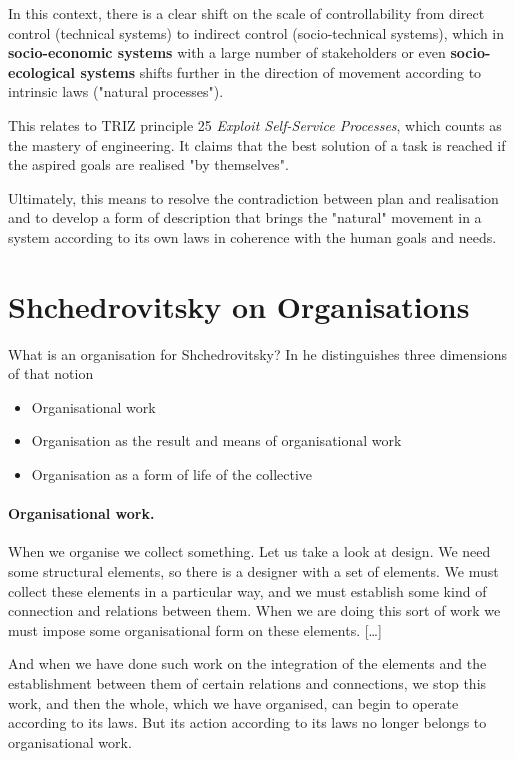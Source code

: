 \documentclass[11pt,a4paper]{article}
\begin{document}
In this context, there is a clear shift on the scale of controllability from
direct control (technical systems) to indirect control (socio-technical
systems), which in \textbf{socio-economic systems} with a large number of
stakeholders or even \textbf{socio-ecological systems} shifts further in the
direction of movement according to intrinsic laws ("natural processes").

This relates to TRIZ principle 25 \emph{Exploit Self-Service Processes}, which
counts as the mastery of engineering.  It claims that the best solution of a
task is reached if the aspired goals are realised "by themselves".

Ultimately, this means to resolve the contradiction between plan and
realisation and to develop a form of description that brings the "natural"
movement in a system according to its own laws in coherence with the human
goals and needs.

\section{Shchedrovitsky on Organisations}

What is an organisation for Shchedrovitsky? In \cite[p. 30 ff]{MSM} he
distinguishes three dimensions of that notion
\begin{itemize}
\item Organisational work
\item Organisation as the result and means of organisational work
\item Organisation as a form of life of the collective
\end{itemize}

\paragraph{Organisational work.}
\cite[p. 26]{MSM} When we organise we collect something. Let us take a look at
design. We need some structural elements, so there is a designer with a set of
elements. We must collect these elements in a particular way, and we must
establish some kind of connection and relations between them. When we are
doing this sort of work we must impose some organisational form on these
elements. [\ldots]

And when we have done such work on the integration of the elements and the
establishment between them of certain relations and connections, we stop this
work, and then the whole, which we have organised, can begin to operate
according to its laws. But its action according to its laws no longer belongs
to organisational work.
\end{document}
